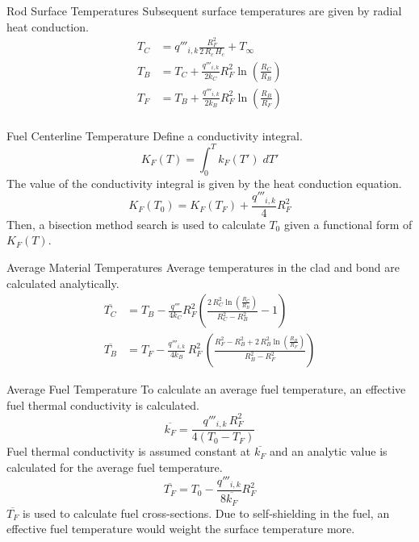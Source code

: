 \begin{frame}{Rod Surface Temperatures}
  Subsequent surface temperatures are given by radial heat conduction.
  \begin{align}
    \label{eq:tc_forward}
    T_C &= q'''_{i,k} \frac{R_F^2}{2\,R_c\,H_c} + T_{\infty} \\
    \label{eq:tb_forward}
    T_B &= T_C + \frac{q'''_{i,k}}{2 k_C} R_F^2
      \ln\left(\frac{R_C}{R_B}\right) \\
    \label{eq:tf_forward}
    T_F &= T_B + \frac{q'''_{i,k}}{2 k_B} R_F^2 
      \ln\left(\frac{R_B}{R_F}\right) \\
  \end{align}
\end{frame}

\begin{frame}{Fuel Centerline Temperature}
  Define a conductivity integral.
  \begin{equation}
    \label{eq:conductivity_integral}
    K_F(T) = \int_0^T k_F(T') \; dT'
  \end{equation}
  The value of the conductivity integral is given by the heat conduction
  equation.
  \begin{equation}
    \label{eq:tcl_conductivity_integral}
    K_F(T_0) = K_F(T_F) + \frac{q'''_{i,k}}{4} R_F^2
  \end{equation}
  Then, a bisection method search is used to calculate $T_0$ given a functional
  form of $K_F(T)$.
\end{frame}

\begin{frame}{Average Material Temperatures}
  Average temperatures in the clad and bond are calculated analytically.
  \begin{align}
    \label{eq:tc_bar}
    \overline{T_C} &= T_B - \frac{q'''}{4 k_C} R_F^2 \left(
      \frac{2 \, R_C^2 \ln\left(\frac{R_C}{R_B}\right)}
      {R_C^2 - R_B^2}  - 1\right) \\
    \label{eq:tb_bar}
    \overline{T_B} &= T_F - \frac{q'''_{i,k}}{4 k_B} \, R_F^2 \, \left(
      \frac{R_F^2 - R_B^2 + 2\,R_B^2 \ln\left(\frac{R_B}{R_F}\right)}
      {R_B^2-R_F^2}\right)
  \end{align}
\end{frame}

\begin{frame}{Average Fuel Temperature}
  To calculate an average fuel temperature, an effective fuel thermal
  conductivity is calculated.
  \begin{equation}
    \label{eq:kfuel_constant}
    \overline{k_F} = \frac{q'''_{i,k} \, R_F^2}{4(T_0-T_F)}
  \end{equation}
  Fuel thermal conductivity is assumed constant at $\overline{k_F}$ and an
  analytic value is calculated for the average fuel temperature.
  \begin{equation}
    \label{eq:tf_bar}
    \overline{T_F} = T_0 - \frac{q'''_{i,k}}{8 \overline{k_F}} R_F^2
  \end{equation}
  $\overline{T_F}$ is used to calculate fuel cross-sections. Due to
  self-shielding in the fuel, an effective fuel temperature would weight the
  surface temperature more.
\end{frame}

